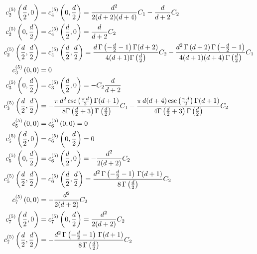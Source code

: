\documentclass[a4paper,11pt,openright,twoside]{book}
\numberwithin{equation}{section}
\begin{document}
{{\begin{align}
\begin{aligned}[c]
		c_2^{(5)}\left(\frac{d}{2},0\right)&=c_4^{(5)}\left(0,\frac{d}{2}\right)=\frac{d^2}{2(d+2)(d+4)}C_1-\frac{d}{d+2}C_2\\
		c_2^{(5)}\left(0,\frac{d}{2}\right)&=c_4^{(5)}\left(\frac{d}{2},0\right)=\frac{d}{d+2}C_2\notag\\
		c_2^{(5)}\left(\frac{d}{2},\frac{d}{2}\right)&=c_4^{(5)}\left(\frac{d}{2},\frac{d}{2}\right)=\frac{d\,\Gamma\left(-\frac{d}{2}-1\right)\Gamma(d+2)}{4(d+1)\Gamma\left(\frac{d}{2}\right)}C_2-\frac{d^2\,\Gamma\left(d+2\right)\Gamma\left(-\frac{d}{2}-1\right)}{4(d+1)(d+4)\,\Gamma\left(\frac{d}{2}\right)}C_1\\
		c^{(5)}_3\left(0,0\right)&=0\\
		c^{(5)}_3\left(0,\frac{d}{2}\right)&=c^{(5)}_3\left(\frac{d}{2},0\right)=-C_2\frac{d}{d+2}\\
		c^{(5)}_3\left(\frac{d}{2},\frac{d}{2}\right)&=-\frac{\pi\,d^2\csc\left(\frac{\pi\,d}{2}\right)\Gamma(d+1)}{8\Gamma\left(\frac{d}{2}+3\right)\Gamma\left(\frac{d}{2}\right)}C_1-\frac{\pi\,d(d+4)\csc\left(\frac{\pi\,d}{2}\right)\Gamma(d+1)}{4\Gamma\left(\frac{d}{2}+3\right)\Gamma\left(\frac{d}{2}\right)}C_2\\
		c_5^{(5)}\left(0,0\right)&=c_6^{(5)}\left(0,0\right)=0\\
		c_5^{(5)}\left(\frac{d}{2},0\right)&=c_6^{(5)}\left(0,\frac{d}{2}\right)=0\notag\\
		c_5^{(5)}\left(0,\frac{d}{2}\right)&=c_6^{(5)}\left(\frac{d}{2},0\right)=-\frac{d^2}{2(d+2)}C_2\notag\\
		c_5^{(5)}\left(\frac{d}{2},\frac{d}{2}\right)&=c_6^{(5)}\left(\frac{d}{2},\frac{d}{2}\right)=\frac{d^2\,\Gamma\left(-\frac{d}{2}-1\right)\,\Gamma(d+1)}{8\,\Gamma\left(\frac{d}{2}\right)}C_2
		\\
		c_7^{(5)}\left(0,0\right)&=-\frac{d^2}{2(d+2)}C_2\notag\\
		c_7^{(5)}\left(\frac{d}{2},0\right)&=c_7^{(5)}\left(0,\frac{d}{2}\right)=\frac{d^2}{2(d+2)}C_2\notag\\
		c_7^{(5)}\left(\frac{d}{2},\frac{d}{2}\right)&=-\frac{d^2\,\Gamma\left(-\frac{d}{2}-1\right)\,\Gamma(d+1)}{8\,\Gamma\left(\frac{d}{2}\right)}C_2
	\end{aligned}
\end{align}
}}
\end{document}
